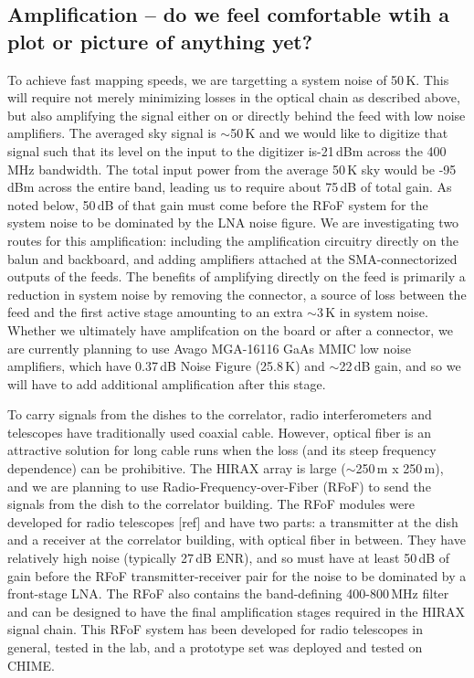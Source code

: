 \documentclass[]{spie}  %
\begin{document}
\subsection{Amplification -- do we feel comfortable wtih a plot or picture of anything yet?}

To achieve fast mapping speeds, we are targetting a system noise of 50\,K. This will require not merely minimizing losses in the optical chain as described above, but also amplifying the signal either on or directly behind the feed with low noise amplifiers. The averaged sky signal is $\sim$50\,K %
and we would like to digitize that signal such that its level on the input to the digitizer is-21\,dBm across the 400\,MHz bandwidth. The total input power from the average 50\,K sky would be -95\,dBm across the entire band, leading us to require about 75\,dB of total gain. As noted below, 50\,dB of that gain must come before the RFoF system for the system noise to be dominated by the LNA noise figure. We are investigating two routes for this amplification: including the amplification circuitry directly on the balun and backboard, and adding amplifiers attached at the SMA-connectorized outputs of the feeds. The benefits of amplifying directly on the feed is primarily a reduction in system noise by removing the connector, a source of loss between the feed and the first active stage amounting to an extra $\sim$3\,K in system noise. Whether we ultimately have amplifcation on the board or after a connector, we are currently planning to use Avago MGA-16116 GaAs MMIC low noise amplifiers, which have 0.37\,dB Noise Figure (25.8\,K) and $\sim$22\,dB gain, and so we will have to add additional amplification after this stage. \newline

To carry signals from the dishes to the correlator, radio interferometers and telescopes have traditionally used coaxial cable. However, optical fiber is an attractive solution for long cable runs when the loss (and its steep frequency dependence) can be prohibitive. The HIRAX array is large ($\sim$250\,m x 250\,m), and we are planning to use Radio-Frequency-over-Fiber (RFoF) to send the signals from the dish to the correlator building. The RFoF modules were developed for radio telescopes [ref] and have two parts: a transmitter at the dish and a receiver at the correlator building, with optical fiber in between. They have relatively high noise (typically 27\,dB ENR), and so must have at least 50\,dB of gain before the RFoF transmitter-receiver pair for the noise to be dominated by a front-stage LNA. The RFoF also contains the band-defining 400-800\,MHz filter and can be designed to have the final amplification stages required in the HIRAX signal chain. This RFoF system has been developed for radio telescopes in general, tested in the lab, and a prototype set was deployed and tested on CHIME. \newline      
\end{document}
